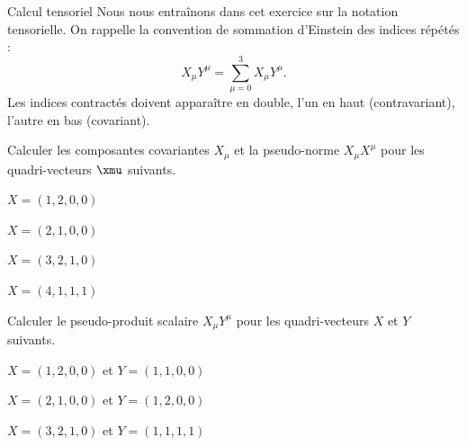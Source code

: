 \begin{exo}[PC][1][appli]{Calcul tensoriel}
  \hauteurLargeurCadreReponse{8mm}{11cm}
  Nous nous entraînons dans cet exercice sur la notation tensorielle. On rappelle la convention de sommation d'Einstein des indices répétés :
  \begin{equation}
    X_\mu Y^\mu = \sum_{\mu=0}^3 X_\mu Y^\mu.
  \end{equation}
  Les indices contractés doivent apparaître en double, l’un en haut (contravariant), l’autre en bas (covariant).
  \begin{quest}
    \item	
    Calculer les composantes covariantes $X_\mu$ et la pseudo-norme $X_\mu X^\mu$ pour les quadri-vecteurs $\xmu$ suivants.
    
    
    \begin{enonce}
    $X=(1,2,0,0)$
  \end{enonce}

  \begin{enonce}
    $X=(2,1,0,0)$
  \end{enonce}

  \begin{enonce}
    $X=(3,2,1,0)$
  \end{enonce}

  \begin{enonce}
    $X=(4,1,1,1)$
  \end{enonce}
  \item	
  Calculer le pseudo-produit scalaire $X_\mu Y^\mu$ pour les quadri-vecteurs  $X$ et $Y$ suivants.
  
  
  \begin{enonce}
  $X=(1,2,0,0)$ et $Y=(1,1,0,0)$
\end{enonce}

\begin{enonce}
  $X=(2,1,0,0)$ et $Y=(1,2,0,0)$
\end{enonce}

\begin{enonce}
  $X=(3,2,1,0)$ et $Y=(1,1,1,1)$
\end{enonce}


\end{quest}
\end{exo}
